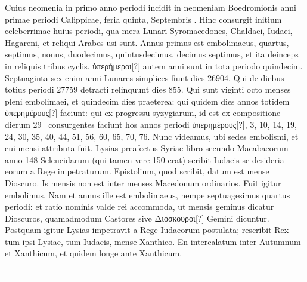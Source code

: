 Cuius neomenia in primo anno periodi incidit in neomeniam Boedromionis
anni  primae periodi Calippicae, feria quinta, Septembris
.
Hinc consurgit initium celeberrimae huius periodi,
qua mera Lunari Syromacedones, Chaldaei, Iudaei, Hagareni, et
reliqui Arabes usi sunt.
Annus primus est embolimaeus, quartus, septimus,
nonus, duodecimus, quintusdecimus, decimus septimus,
et ita deinceps in reliquis tribus cyclis.
\textgreek{ὑπερήμεροι[?]} autem anni sunt in
tota periodo quindecim.
Septuaginta sex enim anni Lunares simplices
fiunt dies 26904.
Qui de diebus totius periodi 27759 detracti
relinquunt dies 855.
Qui sunt viginti octo menses pleni embolimaei,
et quindecim dies praeterea:
 qui quidem dies annos totidem \textgreek{ὑπερημέρους[?]}
faciunt: qui ex progressu syzygiarum, id est ex compositione dierum
29~ consurgentes faciunt hos annos periodi
 \textgreek{ὑπερημέρους[?]}, 3, 10,
14, 19, 24, 30, 35, 40, 44, 51, 56, 60, 65, 70, 76.
Nunc videamus, ubi sedes embolismi, et cui mensi attributa fuit.
Lysias preafectus Syriae libro
secundo Macabaeorum anno 148 Seleucidarum (qui tamen vere 150
erat) scribit Iudaeis se desideria eorum a Rege impetraturum.
Epistolium,
quod scribit, datum est mense Dioscuro.
Is mensis non est inter
menses Macedonum ordinarios.
Fuit igitur embolimus.
Nam et
annus ille est embolimaeus, nempe septuagesimus quartus periodi: et
ratio nominis valde rei accommoda, ut mensis geminus dicatur Dioscuros,
quamadmodum Castores sive \textgreek{Διόσκουροι[?]} Gemini dicuntur.
Postquam igitur Lysias impetravit a Rege Iudaeorum postulata; rescribit
Rex tum ipsi Lysiae, tum Iudaeis, mense Xanthico.
En intercalatum
inter Autumnum et Xanthicum, et quidem longe ante Xanthicum.
%
\begin{table}[htbp]
  \centering
  \begin{tabular}{c c}
    \begin{minipage}[][0.44\linewidth][t]{0.4\linewidth}
      
    \end{minipage}
&
    \begin{minipage}[][0.44\linewidth][t]{0.4\linewidth}
      
    \end{minipage} \\
    \addlinespace[0.85in] %
  \end{tabular}
\end{table}
